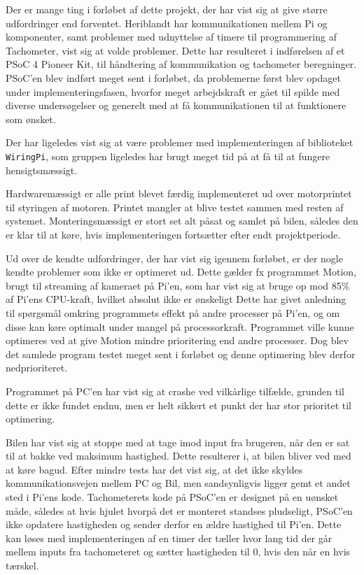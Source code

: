 Der er mange ting i forløbet af dette projekt, der har vist sig at give større udfordringer end forventet. 
Heriblandt har \IIC kommunikationen mellem Pi og \IIC komponenter, samt problemer med udnyttelse af timere til programmering af Tachometer, vist sig at volde problemer. 
Dette har resulteret i indførelsen af et PSoC 4 Pioneer Kit, til håndtering af \IIC kommunikation og tachometer beregninger. 
PSoC'en blev indført meget sent i forløbet, da problemerne først blev opdaget under implementeringsfasen, hvorfor meget arbejdskraft er gået til spilde med diverse undersøgelser og generelt med at få kommunikationen til at funktionere som ønsket.

Der har ligeledes vist sig at være problemer med implementeringen af biblioteket \texttt{WiringPi}, som gruppen ligeledes har brugt meget tid på at få til at fungere hensigtsmæssigt.

Hardwaremæssigt er alle print blevet færdig implementeret ud over motorprintet til styringen af motoren. 
Printet mangler at blive testet sammen med resten af systemet.
Monteringsmæssigt er stort set alt påsat og samlet på bilen, således den er klar til at køre, hvis implementeringen fortsætter efter endt projektperiode.

Ud over de kendte udfordringer, der har vist sig igennem forløbet, er der nogle kendte problemer som ikke er optimeret ud. 
Dette gælder fx programmet Motion, brugt til streaming af kameraet på Pi'en, som har vist sig at bruge op mod 85\% af Pi'ens CPU-kraft, hvilket absolut ikke er ønskeligt
Dette har givet anledning til spørgsmål omkring programmets effekt på andre processer på Pi'en, og om disse kan køre optimalt under mangel på processorkraft. 
Programmet ville kunne optimeres ved at give Motion mindre prioritering end andre processer. 
Dog blev det samlede program testet meget sent i forløbet og denne optimering blev derfor nedprioriteret.

Programmet på PC'en har vist sig at crashe ved vilkårlige tilfælde, grunden til dette er ikke fundet endnu, men er helt sikkert et punkt der har stor prioritet til optimering.

Bilen har vist sig at stoppe med at tage imod input fra brugeren, når den er sat til at bakke ved maksimum hastighed. Dette resulterer i, at bilen bliver ved med at køre bagud. Efter mindre tests har det vist sig, at det ikke skyldes kommunikationsvejen mellem PC og Bil, men sandsynligvis ligger gemt et andet sted i Pi'ens kode. Tachometerets kode på PSoC'en er designet på en uønsket måde, således at hvis hjulet hvorpå det er monteret standses pludseligt, PSoC'en ikke opdatere hastigheden og sender derfor en ældre hastighed til Pi'en. Dette kan løses med implementeringen af en timer der tæller hvor lang tid der går mellem inputs fra tachometeret og sætter hastigheden til 0, hvis den når en hvis tærskel.

